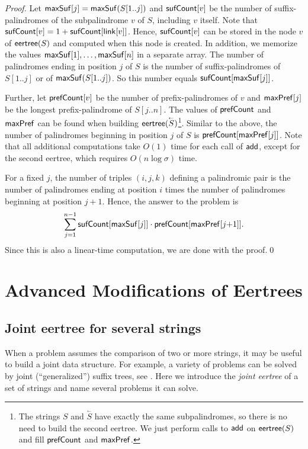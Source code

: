 \documentclass{llncs}
\newcommand{\lvec}[1]{\overset{{}_{\leftarrow}}{#1}}
\def\add{{\sf add}}
\def\eertree{{\sf eertree}}
\def\maxsuf{{\sf maxSuf}}
\def\maxpref{{\sf maxPref}}
\def\link{{\sf link}}
\def\sufc{{\sf sufCount}}
\def\prefc{{\sf prefCount}}
\begin{document}
\begin{proof}
Let $\maxsuf[j]=\maxsuf(S[1..j])$ and $\sufc[v]$ be the number of suffix-palindromes of the subpalindrome $v$ of $S$, including $v$ itself. Note that $\sufc[v] = 1 + \sufc[ \link[v] ]$. Hence, $\sufc[v]$ can be stored in the node $v$ of $\eertree(S)$ and computed when this node is created. In addition, we memorize the values $\maxsuf[1],\ldots,\maxsuf[n]$ in a separate array. The number of palindromes ending in position $j$ of $S$ is the number of suffix-palindromes of $S[1..j]$ or of $\maxsuf(S[1..j])$. So this number equals $\sufc[\maxsuf[j]]$.

Further, let $\prefc[v]$ be the number of prefix-palindromes of $v$ and $\maxpref[j]$ be the longest prefix-palindrome of $S[j..n]$. The values of $\prefc$ and $\maxpref$ can be found when building $\eertree(\lvec{S})$\footnote{The strings $S$ and $\lvec{S}$ have exactly the same subpalindromes, so there is no need to build the second eertree. We just perform calls to $\add$ on $\eertree(S)$ and fill $\prefc$ and $\maxpref$.}. Similar to the above, the number of palindromes beginning in position $j$ of $S$ is $\prefc[\maxpref[j]]$. Note that all additional computations take $O(1)$ time for each call of $\add$, except for the second eertree, which requires $O(n\log\sigma)$ time.

For a fixed $j$, the number of triples $(i,j,k)$ defining a palindromic pair is the number of palindromes ending at position $i$ times the number of palindromes beginning at position $j{+}1$. Hence, the answer to the problem is
$$
\sum_{j=1}^{n-1} \sufc[\maxsuf[j]]\cdot \prefc[\maxpref[j{+}1]].
$$
Since this is also a linear-time computation, we are done with the proof.\qed
\end{proof}


\section{Advanced Modifications of Eertrees}\label{applications}

\subsection{Joint eertree for several strings}\label{common}

When a problem assumes the comparison of two or more strings, it may be useful to build a joint data structure. For example, a variety of problems can be solved by joint (``generalized'') suffix trees, see \cite{Gus97}.  Here we introduce the \emph{joint eertree} of a set of strings and name several problems it can solve.
\end{document}
